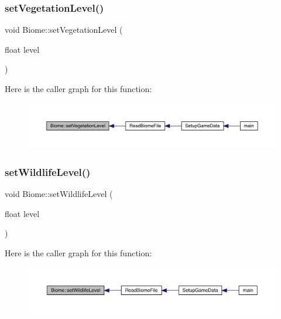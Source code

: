 \subsubsection{\texorpdfstring{set\+Vegetation\+Level()}{setVegetationLevel()}}
{\footnotesize\ttfamily void Biome\+::set\+Vegetation\+Level (\begin{DoxyParamCaption}\item[{float}]{level }\end{DoxyParamCaption})}

Here is the caller graph for this function\+:
\nopagebreak
\begin{figure}[H]
\begin{center}
\leavevmode
\includegraphics[width=350pt]{d6/dd0/class_biome_adbe071450d7411ddd3f886b1c84c2029_icgraph}
\end{center}
\end{figure}
\mbox{\label{class_biome_afe05b01787008c396ccad3ffd7e6d6cd}} 
\subsubsection{\texorpdfstring{set\+Wildlife\+Level()}{setWildlifeLevel()}}
{\footnotesize\ttfamily void Biome\+::set\+Wildlife\+Level (\begin{DoxyParamCaption}\item[{float}]{level }\end{DoxyParamCaption})}

Here is the caller graph for this function\+:
\nopagebreak
\begin{figure}[H]
\begin{center}
\leavevmode
\includegraphics[width=350pt]{d6/dd0/class_biome_afe05b01787008c396ccad3ffd7e6d6cd_icgraph}
\end{center}
\end{figure}


